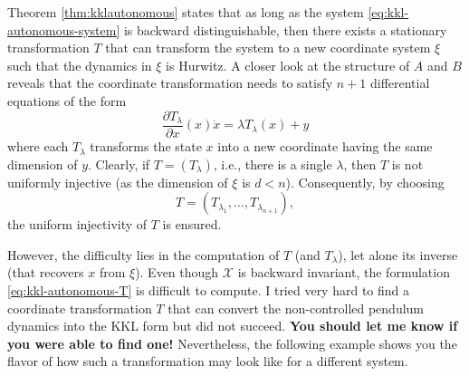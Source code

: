 \documentclass[
]{book}
\theoremstyle{definition}
\theoremstyle{definition}
\theoremstyle{definition}
\theoremstyle{definition}
\theoremstyle{remark}
\begin{document}
Theorem \ref{thm:kklautonomous} states that as long as the system \eqref{eq:kkl-autonomous-system} is backward distinguishable, then there exists a stationary transformation \(T\) that can transform the system to a new coordinate system \(\xi\) such that the dynamics in \(\xi\) is Hurwitz. A closer look at the structure of \(A\) and \(B\) reveals that the coordinate transformation needs to satisfy \(n+1\) differential equations of the form
\[
\frac{\partial T_{\lambda}}{\partial x}(x) \dot{x} = \lambda T_{\lambda} (x) + y 
\]
where each \(T_{\lambda}\) transforms the state \(x\) into a new coordinate having the same dimension of \(y\). Clearly, if \(T = (T_\lambda)\), i.e., there is a single \(\lambda\), then \(T\) is not uniformly injective (as the dimension of \(\xi\) is \(d < n\)). Consequently, by choosing
\[
T = (T_{\lambda_1},\dots,T_{\lambda_{n+1}}),
\]
the uniform injectivity of \(T\) is ensured.

However, the difficulty lies in the computation of \(T\) (and \(T_\lambda\)), let alone its inverse (that recovers \(x\) from \(\xi\)). Even though \(\mathcal{X}\) is backward invariant, the formulation \eqref{eq:kkl-autonomous-T} is difficult to compute. I tried very hard to find a coordinate transformation \(T\) that can convert the non-controlled pendulum dynamics into the KKL form but did not succeed. \textbf{You should let me know if you were able to find one!} Nevertheless, the following example shows you the flavor of how such a transformation may look like for a different system.
\end{document}
